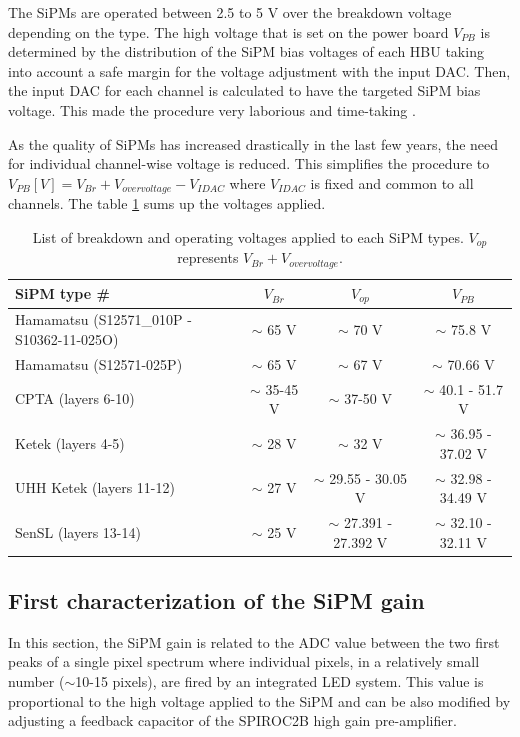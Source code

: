 The SiPMs are operated between 2.5 to 5 V over the breakdown voltage depending on the type. The high voltage that is set on the power board $V_{PB}$ is determined by the distribution of the SiPM bias voltages of each HBU taking into account a safe margin for the voltage adjustment with the input DAC. Then, the input DAC for each channel is calculated to have the targeted SiPM bias voltage. This made the procedure very laborious and time-taking \cite{Hartbrich2012}.

As the quality of SiPMs has increased drastically in the last few years, the need for individual channel-wise voltage is reduced. This simplifies the procedure to $V_{PB} [V] = V_{Br} + V_{overvoltage} - V_{IDAC}$ where $V_{IDAC}$ is fixed and common to all channels. The table \ref{table:Voltage_SiPM} sums up the voltages applied.

\begin{table}[htb!]
  \centering
  \caption{List of breakdown and operating voltages applied to each SiPM types. $V_{op}$ represents $V_{Br} + V_{overvoltage}$.}
  \label{table:Voltage_SiPM}
  \begin{tabular}{@{}lccc@{}}
    \toprule
    SiPM type \# & $V_{Br}$ & $V_{op}$ & $V_{PB}$\\
    \midrule
    Hamamatsu (S12571\_010P - S10362-11-025O) & $\sim$ 65 V & $\sim$ 70 V & $\sim$ 75.8 V\\
    Hamamatsu (S12571-025P) & $\sim$ 65 V & $\sim$ 67 V & $\sim$ 70.66 V\\
    CPTA (layers 6-10) & $\sim$ 35-45 V & $\sim$ 37-50 V & $\sim$ 40.1 - 51.7 V\\
    Ketek (layers 4-5) & $\sim$ 28 V & $\sim$ 32 V & $\sim$ 36.95 - 37.02 V\\
    UHH Ketek (layers 11-12) & $\sim$ 27 V & $\sim$ 29.55 - 30.05 V & $\sim$ 32.98 - 34.49 V\\
    SenSL (layers 13-14) & $\sim$ 25 V & $\sim$ 27.391 - 27.392 V & $\sim$ 32.10 - 32.11 V\\
    \bottomrule
  \end{tabular}
\end{table}

\subsection{First characterization of the SiPM gain}
\label{subsec:GainCharac}

In this section, the SiPM gain is related to the ADC value between the two first peaks of a single pixel spectrum where individual pixels, in a relatively small number ($\sim$10-15 pixels), are fired by an integrated LED system. This value is proportional to the high voltage applied to the SiPM and can be also modified by adjusting a feedback capacitor of the SPIROC2B high gain pre-amplifier.

